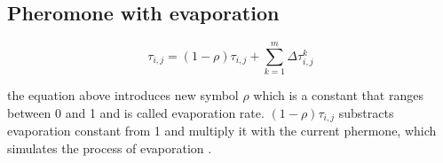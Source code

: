 \documentclass{article}
\begin{document}
\subsection*{Pheromone with evaporation}
\begin{equation}
	\tau_{i, j} = (1-\rho) \tau_{i,j} + \sum_{k=1}^m \Delta{\tau_{i, j} ^k}
\end{equation} 

the equation above introduces new symbol ${\rho}$ which is a constant that ranges between 0 and 1 and is called evaporation rate. ${(1-\rho) \tau_{i,j}}$ substracts evaporation constant from 1 and multiply it with the current phermone, which simulates the process of evaporation \citep*{4129846}.


 
\end{document}
